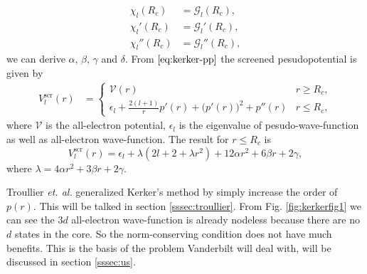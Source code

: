\begin{align}
	\chi_l (R_c)   & = \mathcal{G}_l (R_c),   \\
	\chi_l' (R_c)  & = \mathcal{G}_l' (R_c),  \\
	\chi_l'' (R_c) & = \mathcal{G}_l'' (R_c),
\end{align}
we can derive $\alpha$, $\beta$, $\gamma$ and $\delta$.
From $\eqref{eq:kerker-pp}$ the screened pesudopotential is given by
\begin{align}
	V_l^\text{scr} (r) & =
	\begin{cases}
		\mathcal{V} (r)               & r \geq R_c, \\
		\epsilon_l + \frac{ 2(l+1) }{ r } p'(r)
		+ \big(p'(r) \big)^2 + p''(r) & r \leq R_c,
	\end{cases}
\end{align}
where $\mathcal{V}$ is the all-electron potential, $\epsilon_l$ is the
eigenvalue of pesudo-wave-function as well as all-electron wave-function.
The result for $r \le R_c$ is
\begin{equation}
	V_l^\text{scr} (r) = \epsilon_l + \lambda (2 l + 2 + \lambda r^2) + 12 \alpha r^2 + 6 \beta r + 2 \gamma,
\end{equation}
where $\lambda = 4 \alpha r^2 + 3 \beta r + 2 \gamma$.

Troullier \emph{et. al.} generalized Kerker's method by simply increase
the order of $p (r)$.\cite{troullier1990straightforward}
This will be talked in section \ref{sssec:troullier}.
From Fig. \ref{fig:kerkerfig1} we can see the $3d$ all-electron wave-function is
already nodeless because there are no $d$ states in the core.
So the norm-conserving condition does not have much benefits.
This is the basis of the problem Vanderbilt\cite{Vanderbilt:1990is} will deal with, will be discussed in section \ref{sssec:us}.

